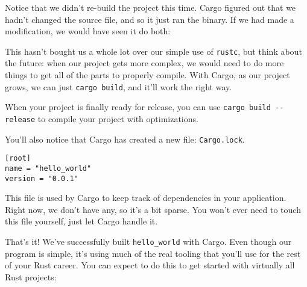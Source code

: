 \documentclass[a4paper,]{book}
\newenvironment{Shaded}{\begin{snugshade}}{\end{snugshade}}
\newcommand{\KeywordTok}[1]{\textcolor[rgb]{0.13,0.29,0.53}{\textbf{{#1}}}}
\newcommand{\NormalTok}[1]{{#1}}
\begin{document}
Notice that we didn't re-build the project this time. Cargo figured out
that we hadn't changed the source file, and so it just ran the binary.
If we had made a modification, we would have seen it do both:

\begin{Shaded}
\end{Shaded}

This hasn't bought us a whole lot over our simple use of \texttt{rustc},
but think about the future: when our project gets more complex, we would
need to do more things to get all of the parts to properly compile. With
Cargo, as our project grows, we can just \texttt{cargo\ build}, and
it'll work the right way.

When your project is finally ready for release, you can use
\texttt{cargo\ build\ -\/-release} to compile your project with
optimizations.

You'll also notice that Cargo has created a new file:
\texttt{Cargo.lock}.

\begin{verbatim}
[root]
name = "hello_world"
version = "0.0.1"
\end{verbatim}

This file is used by Cargo to keep track of dependencies in your
application. Right now, we don't have any, so it's a bit sparse. You
won't ever need to touch this file yourself, just let Cargo handle it.

That's it! We've successfully built \texttt{hello\_world} with Cargo.
Even though our program is simple, it's using much of the real tooling
that you'll use for the rest of your Rust career. You can expect to do
this to get started with virtually all Rust projects:

\begin{Shaded}
\end{Shaded}
\end{document}
